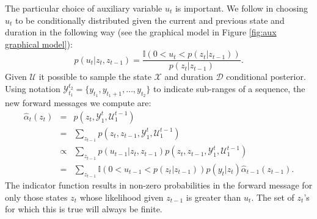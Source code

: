 
The particular choice of auxiliary variable $u_t$ is important.  We follow  \cite{vanGael2008} in choosing $u_t$ to be conditionally distributed given the current and previous state and duration in the following way (see the graphical model in Figure \ref{fig:aux graphical model}):
\begin{equation}
    \label{eqn:slice}
    p(u_t | z_t, z_{t-1}) = 
    \frac
    {\mathbb{I}(0 < u_t < p(z_t | z_{t-1}))} 
    {p(z_t | z_{t-1})}.
\end{equation}
Given $\mathcal{U}$ it possible to sample the state $\mathcal{X}$ and duration $\mathcal{D}$ conditional posterior. 
Using notation $\mathcal{Y}_{t_1}^{t_2} = \{y_{t_1}, y_{t_1+1}, \ldots,y_{t_2}\}$  to indicate sub-ranges of a sequence, the new forward messages we compute are:
\begin{eqnarray}
   \hat{\alpha}_t(z_t) &=& 
   p(z_t, \mathcal{Y}_1^t , \mathcal{U}_1^{t-1})   \label{eqn:scaled forward} \\
   &=& 
   \sum_{z_{t-1}}
   p(z_t, z_{t-1} , \mathcal{Y}_1^t , \mathcal{U}_1^{t-1}) \nonumber \\
   &\propto& 
   \sum_{z_{t-1}}
   p(u_{t-1} | z_t, z_{t-1})
   p(z_t, z_{t-1} , \mathcal{Y}_1^t, \mathcal{U}_1^{t-1}) \nonumber \\
   &=& 
   \sum_{z_{t-1}}
   \mathbb{I}(0 < u_{t-1} < p(z_t | z_{t-1}))
   p(y_t|z_t) \hat{\alpha}_{t-1}(z_{t-1}) \nonumber.
\end{eqnarray}
The indicator function results in non-zero probabilities in the forward message for only those states $z_t$ whose likelihood given $z_{t-1}$ is greater than $u_t$. The set of $z_t$'s for which this is true will always be finite. %
